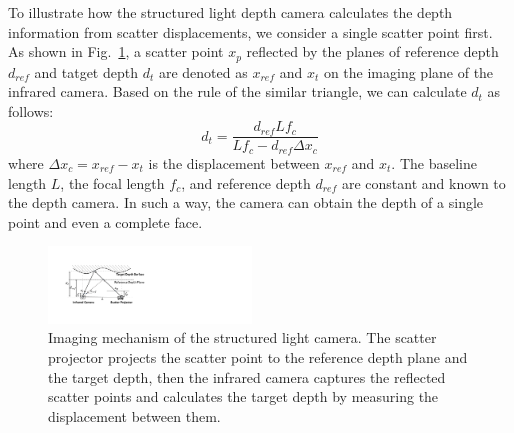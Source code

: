 To illustrate how the structured light depth camera calculates the depth information from scatter displacements, we consider a single scatter point first.
As shown in Fig.~\ref{imaging_mechanism}, a scatter point $x_p$ reflected by the planes of  reference depth $d_{ref}$ and tatget depth $d_t$ are denoted as $x_{ref}$ and $x_{t}$ on the imaging plane of the infrared camera.
Based on the rule of the similar triangle, we can calculate $d_t$ as follows:
\begin{equation}
	d_t= \frac{d_{ref}Lf_c}{Lf_c - d_{ref}\Delta x_c}
	\label{d_cal}
\end{equation}
where $\Delta x_c=x_{ref}-x_{t}$ is the displacement between $x_{ref}$ and $x_{t}$. The baseline length $L$, the focal length $f_c$, and reference depth $d_{ref}$ are constant and known to the depth camera. In such a way, the camera can obtain the depth of a single point and even a complete face.

%


\begin{figure}[!t]
	\centering
	\includegraphics[width=0.48\textwidth]{figures/imaging_mechanism.pdf} 
	\vspace{-0.1in}
	\caption{Imaging mechanism of the structured light camera. The scatter projector projects the scatter point to the reference depth plane and the target depth, then the infrared camera captures the reflected scatter points and calculates the target depth by measuring the displacement between them. }
	\label{imaging_mechanism}
	\vspace{-0.15in}
\end{figure}

